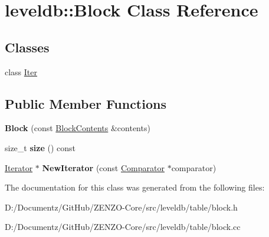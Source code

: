 \hypertarget{classleveldb_1_1_block}{}\section{leveldb\+::Block Class Reference}
\label{classleveldb_1_1_block}
\subsection*{Classes}
\begin{DoxyCompactItemize}
\item 
class \mbox{\hyperlink{classleveldb_1_1_block_1_1_iter}{Iter}}
\end{DoxyCompactItemize}
\subsection*{Public Member Functions}
\begin{DoxyCompactItemize}
\item 
\mbox{\label{classleveldb_1_1_block_a242f2101a3c906b6f75f5c008e3ecdd9}} 
{\bfseries Block} (const \mbox{\hyperlink{structleveldb_1_1_block_contents}{Block\+Contents}} \&contents)
\item 
\mbox{\label{classleveldb_1_1_block_a032bc7141317285647397ba1e116b1eb}} 
size\+\_\+t {\bfseries size} () const
\item 
\mbox{\label{classleveldb_1_1_block_a336289029f37d18d31a1a3c178afc7b3}} 
\mbox{\hyperlink{classleveldb_1_1_iterator}{Iterator}} $\ast$ {\bfseries New\+Iterator} (const \mbox{\hyperlink{structleveldb_1_1_comparator}{Comparator}} $\ast$comparator)
\end{DoxyCompactItemize}


The documentation for this class was generated from the following files\+:\begin{DoxyCompactItemize}
\item 
D\+:/\+Documentz/\+Git\+Hub/\+Z\+E\+N\+Z\+O-\/\+Core/src/leveldb/table/block.\+h\item 
D\+:/\+Documentz/\+Git\+Hub/\+Z\+E\+N\+Z\+O-\/\+Core/src/leveldb/table/block.\+cc\end{DoxyCompactItemize}
